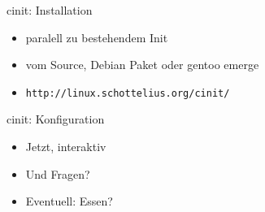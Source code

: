 \documentclass[pdf,autumn,slideColor,colorBG,total]{prosper}
\begin{document}
\begin{slide}{cinit: Installation}
\begin{itemize}
\item paralell zu bestehendem Init
\item vom Source, Debian Paket oder gentoo emerge
\item \verb=http://linux.schottelius.org/cinit/=
\end{itemize}
\end{slide}
\begin{slide}{cinit: Konfiguration}
\begin{itemize}
\item Jetzt, interaktiv
\item Und Fragen?
\item Eventuell: Essen?
\end{itemize}
\end{slide}
\end{document}
